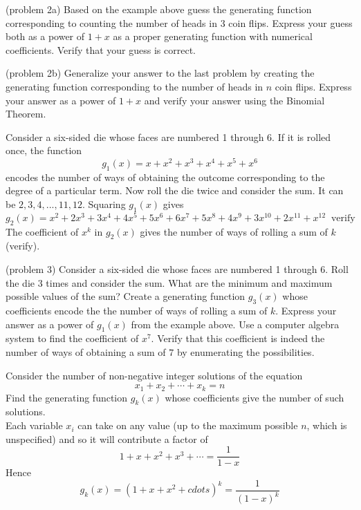 \documentclass[handout]{ximera}
\begin{document}
\begin{problem}(problem 2a)
Based on the example above guess the generating function corresponding to counting the number of heads in 3 coin flips.
Express your guess both as a power of $1+x$ as a proper generating function with numerical coefficients.
Verify that your guess is correct. 
\end{problem}

\begin{problem}(problem 2b)
Generalize your answer to the last problem by creating the generating function corresponding to the 
number of heads in $n$ coin flips.
Express your answer as a power of $1+x$ and verify your answer using the Binomial Theorem.
\end{problem}
 

\begin{example}[example 3]
Consider a six-sided die whose faces are numbered 1 through 6. If it is rolled once, the function
\[
g_1(x) = x + x^2 + x^3 + x^4 + x^5 + x^6
\]
encodes the number of ways of obtaining the outcome corresponding to the degree of a particular term.
Now roll the die twice and consider the sum. It can be $2, 3, 4, ..., 11, 12$. Squaring $g_1(x)$ gives
\[
g_2(x) = x^2 + 2x^3 + 3x^4 + 4x^5 + 5x^6 + 6x^7 + 5x^8 + 4x^9+ 3x^{10} + 2x^{11} + x^{12} \;\; \text{verify}
\]
The coefficient of $x^k$ in $g_2(x)$ gives the number of ways of rolling a sum of $k$ (verify).
\end{example}

\begin{problem}(problem 3)
Consider a six-sided die whose faces are numbered 1 through 6. Roll the die 3 times and consider the sum.
What are the minimum and maximum possible values of the sum? Create a generating function $g_3(x)$ whose coefficients 
encode the the number of ways of rolling a sum of $k$.  Express your answer as a power of $g_1(x)$ from the example above.
Use a computer algebra system to find the coefficient of $x^7$. Verify that this coefficient is 
indeed the number of ways of obtaining a sum of $7$ by enumerating the possibilities.
\end{problem}


\begin{example}[example 4]
Consider the number of non-negative integer solutions of the equation
\[
x_1 + x_2 + \cdots + x_k = n
\]
Find the generating function $g_k(x)$ whose coefficients give the number of such solutions.\\
Each variable $x_i$ can take on any value (up to the maximum possible $n$, which is unspecified) and so it will contribute 
a factor of 
\[
1 + x + x^2 +x^3 + \cdots = \frac{1}{1-x}
\]
Hence
\[
g_k(x) = (1+x+x^2 + cdots)^k = \frac{1}{(1-x)^k}
\]
\end{example}
\end{document}
